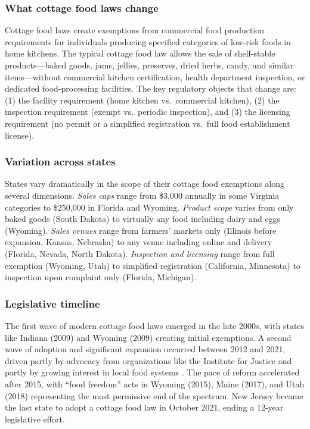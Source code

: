 \documentclass[12pt]{article}
\begin{document}
\subsubsection*{What cottage food laws change} Cottage food laws create exemptions from commercial food production requirements for individuals producing specified categories of low-risk foods in home kitchens. The typical cottage food law allows the sale of shelf-stable products---baked goods, jams, jellies, preserves, dried herbs, candy, and similar items---without commercial kitchen certification, health department inspection, or dedicated food-processing facilities. The key regulatory objects that change are: (1) the facility requirement (home kitchen vs.\ commercial kitchen), (2) the inspection requirement (exempt vs.\ periodic inspection), and (3) the licensing requirement (no permit or a simplified registration vs.\ full food establishment license).

\subsubsection*{Variation across states} States vary dramatically in the scope of their cottage food exemptions along several dimensions. \textit{Sales caps} range from \$3,000 annually in some Virginia categories to \$250,000 in Florida and Wyoming. \textit{Product scope} varies from only baked goods (South Dakota) to virtually any food including dairy and eggs (Wyoming). \textit{Sales venues} range from farmers' markets only (Illinois before expansion, Kansas, Nebraska) to any venue including online and delivery (Florida, Nevada, North Dakota). \textit{Inspection and licensing} range from full exemption (Wyoming, Utah) to simplified registration (California, Minnesota) to inspection upon complaint only (Florida, Michigan).

\subsubsection*{Legislative timeline} The first wave of modern cottage food laws emerged in the late 2000s, with states like Indiana (2009) and Wyoming (2009) creating initial exemptions. A second wave of adoption and significant expansion occurred between 2012 and 2021, driven partly by advocacy from organizations like the Institute for Justice and partly by growing interest in local food systems \citep{ij2023bakingbad}. The pace of reform accelerated after 2015, with ``food freedom'' acts in Wyoming (2015), Maine (2017), and Utah (2018) representing the most permissive end of the spectrum. New Jersey became the last state to adopt a cottage food law in October 2021, ending a 12-year legislative effort.
\end{document}
